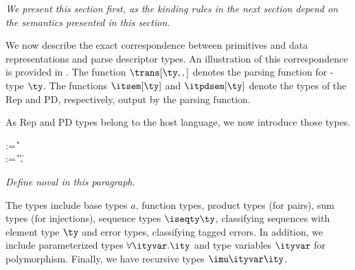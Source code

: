 {\em We present this section first, as the kinding rules in the next
  section depend on the semantics presented in this section.}  

We now describe the exact correspondence between \ddc{} primitives and
data representations and parse descriptor \implang types. An
illustration of this correspondence is provided in
.  The function $\trans[\ty,,]$ denotes
the parsing function for \ddc{}-type $\ty$. The functions
$\itsem[\ty]$ and $\itpdsem[\ty]$ denote the types of the Rep and PD,
respectively, output by the parsing function.

As \implang{} Rep and PD types belong to the host language, we now
introduce those types.

\begin{bnf}
    \::= 
  \iboolty \| \iintty \| \iunitty \| 
  \invty \nlalt \iecty \| \ioffty \| \ibitsty
  \\
   \meta{\ity} \::= 
      \ibasety \| \iarrow \ity \ity \| \iprod \ity \ity \|
      \isum \ity \ity \nlalt
      \iseq \ity \|
      \ierrty \ity \| \forall \ityvar.\ity  \| \ityvar \nlalt
      \imu \ityvar \ity   
\end{bnf}

{\em Define noval in this paragraph.}

The types include base types $a$, function types, product types (for
pairs), sum types (for injections), sequence types $\iseqty \ty$,
classifying sequences with element type $\ty$ and error types,
classifying tagged errors. In addition, we include parameterized types
$\forall \ityvar.\ity$ and type variables $\ityvar$ for polymorphism.
Finally, we have recursive types $\imu \ityvar \ity$.

